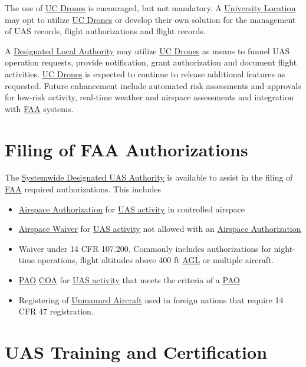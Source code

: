 \documentclass[
]{book}
\providecommand{\tightlist}{%
  \setlength{\itemsep}{0pt}\setlength{\parskip}{0pt}}
\begin{document}
The use of \protect\hyperlink{UCDrones}{UC Drones} is encouraged, but not mandatory. A \protect\hyperlink{UL}{University Location} may opt to utilize \protect\hyperlink{UCDrones}{UC Drones} or develop their own solution for the management of UAS records, flight authorizations and flight records.

A \protect\hyperlink{DLA}{Designated Local Authority} may utilize \protect\hyperlink{UCDrones}{UC Drones} as means to funnel UAS operation requests, provide notification, grant authorization and document flight activities. \protect\hyperlink{UCDrones}{UC Drones} is expected to continue to release additional features as requested. Future enhancement include automated risk assessments and approvals for low-risk activity, real-time weather and airspace assessments and integration with \protect\hyperlink{FAA}{FAA} systems.

\hypertarget{sec-FAA-filing}{%
\section{Filing of FAA Authorizations}\label{sec-FAA-filing}}

The \protect\hyperlink{SDA}{Systemwide Designated UAS Authority} is available to assist in the filing of \protect\hyperlink{FAA}{FAA} required authorizations. This includes

\begin{itemize}
\tightlist
\item
  \protect\hyperlink{AA}{Airspace Authorization} for \protect\hyperlink{UASactivity}{UAS activity} in controlled airspace
\item
  \protect\hyperlink{AW}{Airspace Waiver} for \protect\hyperlink{UASactivity}{UAS activity} not allowed with an \protect\hyperlink{AA}{Airspace Authorization}
\item
  Waiver under 14 CFR 107.200. Commonly includes authorizations for night-time operations, flight altitudes above 400 ft \protect\hyperlink{AGL}{AGL} or multiple aircraft.
\item
  \protect\hyperlink{PAO}{PAO} \protect\hyperlink{COA}{COA} for \protect\hyperlink{UASactivity}{UAS activity} that meets the criteria of a \protect\hyperlink{PAO}{PAO}
\item
  Registering of \protect\hyperlink{UA}{Unmanned Aircraft} used in foreign nations that require 14 CFR 47 registration.
\end{itemize}

\hypertarget{sec-training}{%
\section{UAS Training and Certification}\label{sec-training}}
\end{document}
